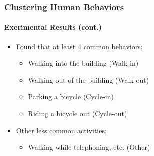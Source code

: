 \begin{frame}
    \frametitle{Clustering Human Behaviors}
    \framesubtitle{Exerimental Results (cont.)}
    
    \begin{itemize}
        \item Found that at least 4 common behaviors:
            \begin{itemize}
                \item Walking into the building (Walk-in)
                \item Walking out of the building (Walk-out)
                \item Parking a bicycle (Cycle-in)
                \item Riding a bicycle out (Cycle-out)
            \end{itemize}
        \item Other less common activities:
            \begin{itemize}
                \item Walking while telephoning, etc. (Other)
            \end{itemize}
    \end{itemize}

\end{frame}



